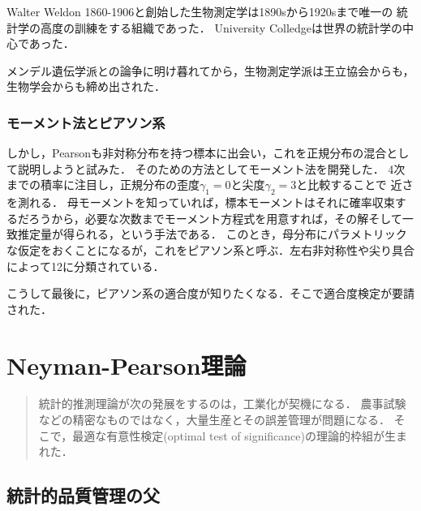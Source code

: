 \documentclass[uplatex,dvipdfmx]{jsreport}
\begin{document}
Walter Weldon 1860-1906と創始した生物測定学は1890sから1920sまで唯一の
統計学の高度の訓練をする組織であった．
University Colledgeは世界の統計学の中心であった．

メンデル遺伝学派との論争に明け暮れてから，生物測定学派は王立協会からも，
生物学会からも締め出された．

\subsection{モーメント法とピアソン系}

しかし，Pearsonも非対称分布を持つ標本に出会い，これを正規分布の混合として説明しようと試みた．
そのための方法としてモーメント法を開発した．
4次までの積率に注目し，正規分布の歪度$\gamma_1=0$と尖度$\gamma_2=3$と比較することで
近さを測れる．
母モーメントを知っていれば，標本モーメントはそれに確率収束するだろうから，必要な次数までモーメント方程式を用意すれば，その解そして一致推定量が得られる，という手法である．
このとき，母分布にパラメトリックな仮定をおくことになるが，これをピアソン系と呼ぶ．左右非対称性や尖り具合によって12に分類されている．

こうして最後に，ピアソン系の適合度が知りたくなる．そこで適合度検定が要請された．

\chapter{Neyman-Pearson理論}

\begin{quotation}
    統計的推測理論が次の発展をするのは，工業化が契機になる．
    農事試験などの精密なものではなく，大量生産とその誤差管理が問題になる．
    そこで，最適な有意性検定(optimal test of significance)の理論的枠組が生まれた．\cite{統計と社会経済分析1-社会的形成}
\end{quotation}

\section{統計的品質管理の父}
\end{document}
